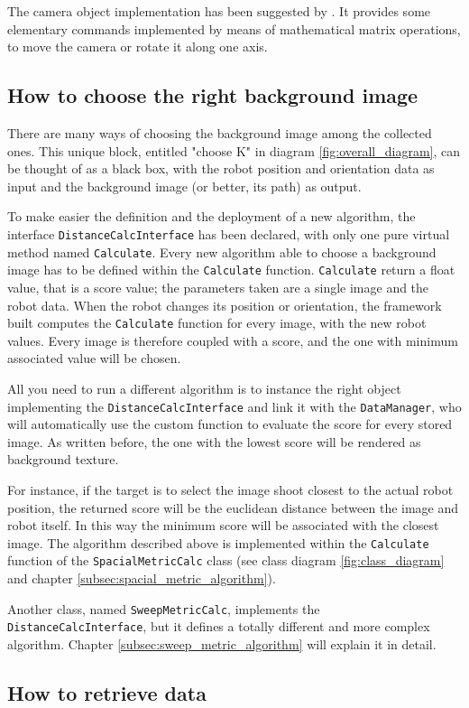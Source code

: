 %
The camera object implementation has been suggested by \cite{opengl:camera}.
It provides some elementary commands implemented by means of mathematical matrix
operations, to move the camera or rotate it along one axis.

\subsection{How to choose the right background image}
\label{sub:howbackgroundimage}

There are many ways of choosing the background image among the collected ones. This unique
block, entitled "choose K" in diagram \ref{fig:overall_diagram}, can be thought of as a
black box, with the robot position and orientation data as input and the background image
(or better, its path) as output.
%

%
To make easier the definition and the deployment of a new algorithm, the interface
\texttt{DistanceCalcInterface} has been declared, with only one pure virtual method named
\texttt{Calculate}. Every new algorithm able to choose a background image has to be defined
within the \texttt{Calculate} function.
\texttt{Calculate} return a float value, that is a score value; the parameters taken are a
single image and the robot data. When the robot changes its position or orientation, the
framework built computes the \texttt{Calculate} function for every image, with the new robot
values. Every image is therefore coupled with a score, and the one with minimum associated value
will be chosen.
%

%
All you need to run a different algorithm is to instance the right object implementing the
\texttt{DistanceCalcInterface} and link it with the \texttt{DataManager}, who will automatically
use the custom function to evaluate the score for every stored image. As written before, the
one with the lowest score will be rendered as background texture.
%

%
For instance, if the target is to select the image shoot closest to the actual robot position,
the returned score will be the euclidean distance between the image and robot itself. In this way
the minimum score will be associated with the closest image.
The algorithm described above is implemented within the \texttt{Calculate} function of the
\texttt{SpacialMetricCalc} class (see class diagram \ref{fig:class_diagram} and chapter
\ref{subsec:spacial_metric_algorithm}).
%

%
Another class, named \texttt{SweepMetricCalc}, implements the
\newline
\texttt{DistanceCalcInterface}, but it defines a totally different and more complex algorithm.
Chapter \ref{subsec:sweep_metric_algorithm} will explain it in detail.

\subsection{How to retrieve data}
\label{sub:howretrievedata}
